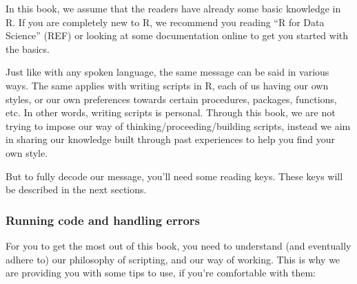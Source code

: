 \documentclass[
]{book}
\begin{document}
In this book, we assume that the readers have already some basic knowledge in R.
If you are completely new to R, we recommend you reading ``R for Data Science'' (REF) or looking at some documentation online to get you started with the basics.

Just like with any spoken language, the same message can be said in various ways. The same applies with writing scripts in R, each of us having our own styles, or our own preferences towards certain procedures, packages, functions, etc. In other words, writing scripts is personal. Through this book, we are not trying to impose our way of thinking/proceeding/building scripts, instead we aim in sharing our knowledge built through past experiences to help you find your own style.

But to fully decode our message, you'll need some reading keys. These keys will be described in the next sections.

\hypertarget{running-code-and-handling-errors}{%
\subsubsection{Running code and handling errors}\label{running-code-and-handling-errors}}

For you to get the most out of this book, you need to understand (and eventually adhere to) our philosophy of scripting, and our way of working. This is why we are providing you with some tips to use, if you're comfortable with them:
\end{document}
